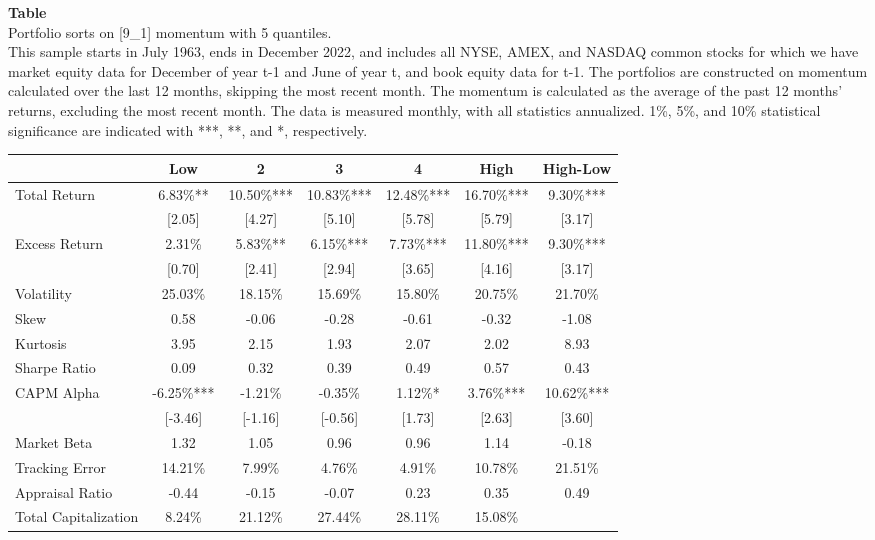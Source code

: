 \begin{table*}[ht!]
\raggedright
{}
\label{tab: quantile_sort_mom_[9_1]_with_5_quantiles}
\textbf{Table \thetable} \\
Portfolio sorts on [9\_1] momentum with 5 quantiles. \\
\hspace*{1em}This sample starts in July 1963, ends in December 2022, and includes all NYSE, AMEX, and NASDAQ common stocks for which we have market equity data for December of year t-1 and June of year t, and book equity data for t-1. The portfolios are constructed on momentum calculated over the last 12 months, skipping the most recent month. The momentum is calculated as the average of the past 12 months' returns, excluding the most recent month. The data is measured monthly, with all statistics annualized.  1\%, 5\%, and 10\% statistical significance are indicated with ***, **, and *, respectively. \\
\vspace{0.5em}
\centering
\begin{adjustbox}{max width=\textwidth}
\begin{tabular}{@{}lcccccc@{}}
\toprule
 & Low & 2 & 3 & 4 & High & High-Low \\
\midrule
Total Return & 6.83\%** & 10.50\%*** & 10.83\%*** & 12.48\%*** & 16.70\%*** & 9.30\%*** \\
 & [2.05] & [4.27] & [5.10] & [5.78] & [5.79] & [3.17] \\
Excess Return & 2.31\% & 5.83\%** & 6.15\%*** & 7.73\%*** & 11.80\%*** & 9.30\%*** \\
 & [0.70] & [2.41] & [2.94] & [3.65] & [4.16] & [3.17] \\
Volatility & 25.03\% & 18.15\% & 15.69\% & 15.80\% & 20.75\% & 21.70\% \\
Skew & 0.58 & -0.06 & -0.28 & -0.61 & -0.32 & -1.08 \\
Kurtosis & 3.95 & 2.15 & 1.93 & 2.07 & 2.02 & 8.93 \\
Sharpe Ratio & 0.09 & 0.32 & 0.39 & 0.49 & 0.57 & 0.43 \\
CAPM Alpha & -6.25\%*** & -1.21\% & -0.35\% & 1.12\%* & 3.76\%*** & 10.62\%*** \\
 & [-3.46] & [-1.16] & [-0.56] & [1.73] & [2.63] & [3.60] \\
Market Beta & 1.32 & 1.05 & 0.96 & 0.96 & 1.14 & -0.18 \\
Tracking Error & 14.21\% & 7.99\% & 4.76\% & 4.91\% & 10.78\% & 21.51\% \\
Appraisal Ratio & -0.44 & -0.15 & -0.07 & 0.23 & 0.35 & 0.49 \\
Total Capitalization & 8.24\% & 21.12\% & 27.44\% & 28.11\% & 15.08\% &  \\
\bottomrule
\end{tabular}
\end{adjustbox}
\end{table*}